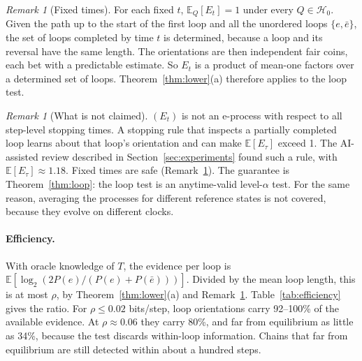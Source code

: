 \documentclass[11pt]{article}
\theoremstyle{definition}
\theoremstyle{remark}
\newtheorem{remark}[theorem]{Remark}
\newcommand{\E}{\mathbb{E}}
\newcommand{\Hnull}{\mathcal{H}_0}
\begin{document}
\begin{remark}[Fixed times]\label{rem:fixed}
For each fixed $t$, $\E_Q[E_t]=1$ under every $Q\in\Hnull$. Given the path up to the start of the first loop and all the unordered loops $\{e,\bar e\}$, the set of loops completed by time $t$ is determined, because a loop and its reversal have the same length. The orientations are then independent fair coins, each bet with a predictable estimate. So $E_t$ is a product of mean-one factors over a determined set of loops. Theorem~\ref{thm:lower}(a) therefore applies to the loop test.
\end{remark}

\begin{remark}[What is not claimed]
$(E_t)$ is not an e-process with respect to all step-level stopping times. A stopping rule that inspects a partially completed loop learns about that loop's orientation and can make $\E[E_\tau]$ exceed 1. The AI-assisted review described in Section~\ref{sec:experiments} found such a rule, with $\E[E_\tau]\approx1.18$. Fixed times are safe (Remark~\ref{rem:fixed}). The guarantee is Theorem~\ref{thm:loop}: the loop test is an anytime-valid level-$\alpha$ test. For the same reason, averaging the processes for different reference states is not covered, because they evolve on different clocks.
\end{remark}

\paragraph{Efficiency.} With oracle knowledge of $T$, the evidence per loop is $\E[\log_2(2P(e)/(P(e)+P(\bar e)))]$. Divided by the mean loop length, this is at most $\rho$, by Theorem~\ref{thm:lower}(a) and Remark~\ref{rem:fixed}. Table~\ref{tab:efficiency} gives the ratio. For $\rho\le0.02$ bits/step, loop orientations carry 92--100\% of the available evidence. At $\rho\approx0.06$ they carry 80\%, and far from equilibrium as little as 34\%, because the test discards within-loop information. Chains that far from equilibrium are still detected within about a hundred steps.

\begin{table}[h!]
\centering
\caption{Oracle evidence rate of the loop test relative to the optimal rate $\rho$ (bits/step), using the asymptotically most visited reference state ($\arg\max\pi$), which the burn-in rule selects with high probability. Simulation of up to $6\times10^5$ loops per chain; $\pm$ one standard error. The true ratio is at most 1; the entry above 1 is within Monte Carlo error.}
\label{tab:efficiency}

\end{table}
\end{document}
